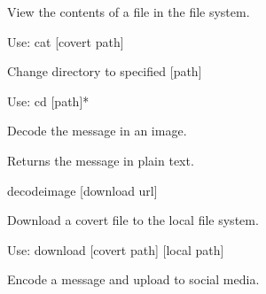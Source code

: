 \documentclass[letterpaper,12pt,openany,oneside]{sphinxmanual}
\begin{document}
\begin{fulllineitems}
\begin{fulllineitems}
\end{fulllineitems}


\begin{fulllineitems}
\label{console:covertFS.console.Console.do_cat}
View the contents of a file in the file system.

Use: cat {[}covert path{]}

\end{fulllineitems}


\begin{fulllineitems}
\label{console:covertFS.console.Console.do_cd}
Change directory to specified {[}path{]}

Use: cd {[}path{]}*

\end{fulllineitems}


\begin{fulllineitems}
\label{console:covertFS.console.Console.do_decodemsg}
Decode the message in an image.

Returns the message in plain text.

decodeimage {[}download url{]}

\end{fulllineitems}


\begin{fulllineitems}
\label{console:covertFS.console.Console.do_download}
Download a covert file to the local file system.

Use: download {[}covert path{]} {[}local path{]}

\end{fulllineitems}


\begin{fulllineitems}
\label{console:covertFS.console.Console.do_encodemsg}
Encode a message and upload to social media.


\end{fulllineitems}
\end{fulllineitems}
\end{document}
